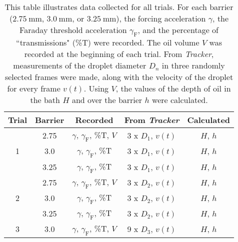 \begin{table}[h]
\caption{This table illustrates data collected for all trials. For each barrier ($2.75~\mathrm{mm}$, $3.0~\mathrm{mm}$, or $3.25~\mathrm{mm}$), the forcing acceleration $\gamma$, the Faraday threshold acceleration $\gamma_\mathrm{F}$, and the percentage of ``transmissions" (\%T) were recorded. The oil volume $V$ was recorded at the beginning of each trial. From \textit{Tracker}, measurements of the droplet diameter $D_n$ in three randomly selected frames were made, along with the velocity of the droplet for every frame $v(t)$. Using $V$, the values of the depth of oil in the bath $H$ and over the barrier $h$ were calculated.}
\begin{center}
\begin{tabular}{ccccc}

\hline
Trial & Barrier & Recorded & From \textit{Tracker}  & Calculated \\
\hline
\multirow{3}{*}{1} & 2.75 & $\gamma$, $\gamma_\mathrm{F}$, \%T, $V$ & {3 x }$D_1$, $v(t)$ & $H$, $h$ \\
                   & 3.0 & $\gamma$, $\gamma_\mathrm{F}$, \%T & {3 x }$D_1$, $v(t)$ & $H$, $h$   \\
                   & 3.25 & $\gamma$, $\gamma_\mathrm{F}$, \%T & {3 x }$D_1$, $v(t)$ & $H$, $h$  \\
                   \hline
\multirow{3}{*}{2} & 2.75 & $\gamma$, $\gamma_\mathrm{F}$, \%T, $V$ & {3 x }$D_2$, $v(t)$ & $H$, $h$ \\
                   & 3.0 & $\gamma$, $\gamma_\mathrm{F}$, \%T & {3 x }$D_2$, $v(t)$ & $H$, $h$   \\
                   & 3.25 & $\gamma$, $\gamma_\mathrm{F}$, \%T & {3 x }$D_2$, $v(t)$ & $H$, $h$  \\
                   \hline
\multirow{1}{*}{3} & 3.0 & $\gamma$, $\gamma_\mathrm{F}$, \%T, $V$ & {9 x }$D_3$, $v(t)$ & $H$, $h$ \\   
\hline         
                     
\end{tabular}
\end{center} 
\label{datacollection} 
\end{table}


